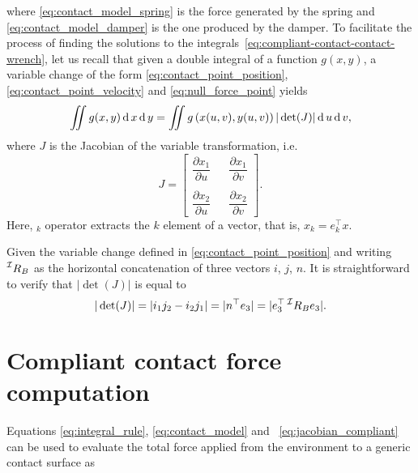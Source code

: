 where \eqref{eq:contact_model_spring} is the force generated by the spring and \eqref{eq:contact_model_damper} is the one produced by the damper. 
To facilitate the process of finding the solutions to the integrals~\eqref{eq:compliant-contact-contact-wrench}, let us recall that given
a double integral of a function $g(x, y)$, a variable change of the form \eqref{eq:contact_point_position}, \eqref{eq:contact_point_velocity} and \eqref{eq:null_force_point} yields
\begin{equation}
    \int\limits\!\!\!\! \int\limits g(x, y) \diff x \diff y = \int\limits\!\!\!\! \int\limits g\left(x(u,v), y(u,v)\right) |\det(J)| \diff u \diff v,
    \label{eq:integral_rule}
\end{equation}
where $J$ is the Jacobian of the variable transformation, i.e. 
\begin{equation}
    J = \begin{bmatrix}
       \dfrac{\partial x_1}{\partial u} & & \dfrac{\partial x_1}{\partial v} \\ 
       \\
      \dfrac{\partial x_2}{\partial u} & & \dfrac{\partial x_2}{\partial v} 
    \end{bmatrix}.
\end{equation}
Here, ${}_k$ operator extracts the $k$ element of a vector, that is, $x_k =  e_k^\top x$.
\par
Given the variable change defined in \eqref{eq:contact_point_position} and writing $\prescript{\mathcal{I}}{}R _B$ as the horizontal concatenation of three vectors $i$, $j$, $n$. It is straightforward to verify that $|\det(J)|$ is equal to 
\begin{equation}
    |\det(J)|  =  | i_1 j_2 - i_2 j_1 | = | n^\top e_3 | = | e_3 ^\top \prescript{\mathcal{I}}{}R _B e_3 | .
    \label{eq:jacobian_compliant}
\end{equation}

\section{Compliant contact force computation}
Equations \eqref{eq:integral_rule}, \eqref{eq:contact_model} and ~\eqref{eq:jacobian_compliant} can be used to evaluate the total force applied from the environment to a generic contact surface as

